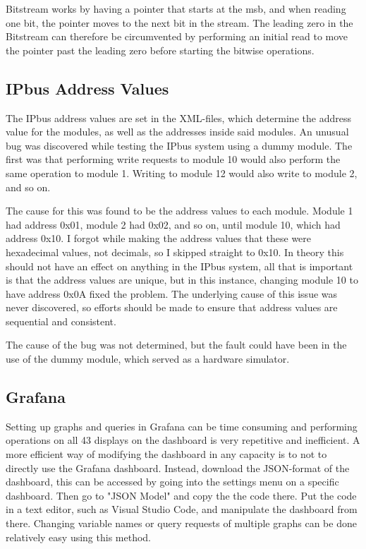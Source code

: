 \documentclass[main.tex]{subfiles}
\begin{document}
Bitstream works by having a pointer that starts at the \gls{msb}, and when reading one bit, the pointer moves to the next bit in the stream. The leading zero in the Bitstream can therefore be circumvented by performing an initial read to move the pointer past the leading zero before starting the bitwise operations.

\subsection{IPbus Address Values}

The IPbus address values are set in the XML-files, which determine the address value for the modules, as well as the addresses inside said modules. An unusual bug was discovered while testing the IPbus system using a dummy module. The first was that performing write requests to module 10 would also perform the same operation to module 1. Writing to module 12 would also write to module 2, and so on.

The cause for this was found to be the address values to each module. Module 1 had address 0x01, module 2 had 0x02, and so on, until module 10, which had address 0x10. I forgot while making the address values that these were hexadecimal values, not decimals, so I skipped straight to 0x10. In theory this should not have an effect on anything in the IPbus system, all that is important is that the address values are unique, but in this instance, changing module 10 to have address 0x0A fixed the problem. The underlying cause of this issue was never discovered, so efforts should be made to ensure that address values are sequential and consistent.

The cause of the bug was not determined, but the fault could have been in the use of the dummy module, which served as a hardware simulator.

\subsection{Grafana}

Setting up graphs and queries in Grafana can be time consuming and performing operations on all 43 displays on the dashboard is very repetitive and inefficient. A more efficient way of modifying the dashboard in any capacity is to not to directly use the Grafana dashboard. Instead, download the JSON-format of the dashboard, this can be accessed by going into the settings menu on a specific dashboard. Then go to "JSON Model" and copy the the code there. Put the code in a text editor, such as Visual Studio Code, and manipulate the dashboard from there. Changing variable names or query requests of multiple graphs can be done relatively easy using this method.
\end{document}
